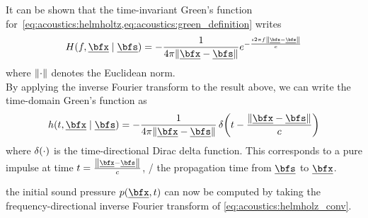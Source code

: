 It can be shown \cite{Kutruff} that the time-invariant Green's function for~\cref{eq:acoustics:helmholtz,eq:acoustics:green_definition} writes
\begin{equation}
    \label{eq:acoustics:greenFreeFreq}
    H(f, \positionMicrophone \mid \positionSource) = - \frac{1}{4 \pi \norm{\positionMicrophone - \positionSource}} e^{- \frac{\Ii 2 \pi f \norm{\positionMicrophone - \positionSource}}{\speedOfSound}}
\end{equation}
where $\norm{\cdot}$ denotes the Euclidean norm.
\\By applying the inverse Fourier transform to the result above, we can write the time-domain Green's function as
\begin{equation}
    \label{eq:acoustics:greenFreeTime}
    h(t, \positionMicrophone \mid \positionSource) =
        - \frac{1}{4 \pi \norm{\positionMicrophone - \positionSource}}
        \diracOf{t - \frac{\norm{\positionMicrophone - \positionSource}}{\speedOfSound}}
\end{equation}
where $\diracOf{\cdot}$ is the time-directional Dirac delta function.
This corresponds to a pure impulse at time $t = \tfrac{\norm{\positionMicrophone - \positionSource}}{\speedOfSound}$,
\ie/ the propagation time from $\positionSource$ to $\positionMicrophone$.

 the initial sound pressure $\pressureSpaceTime$ can now be computed by taking the frequency-directional inverse Fourier transform of \cref{eq:acoustics:helmholz_conv}.





